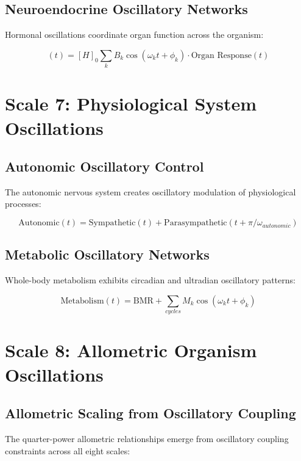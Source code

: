 \documentclass[twocolumn]{article}
\begin{document}
\subsection{Neuroendocrine Oscillatory Networks}

Hormonal oscillations coordinate organ function across the organism:

\begin{equation}
[H](t) = [H]_0 \sum_{k} B_k \cos(\omega_k t + \phi_k) \cdot \text{Organ Response}(t)
\end{equation}

\section{Scale 7: Physiological System Oscillations}

\subsection{Autonomic Oscillatory Control}

The autonomic nervous system creates oscillatory modulation of physiological processes:

\begin{equation}
\text{Autonomic}(t) = \text{Sympathetic}(t) + \text{Parasympathetic}(t + \pi/\omega_{autonomic})
\end{equation}

\subsection{Metabolic Oscillatory Networks}

Whole-body metabolism exhibits circadian and ultradian oscillatory patterns:

\begin{equation}
\text{Metabolism}(t) = \text{BMR} + \sum_{cycles} M_k \cos(\omega_k t + \phi_k)
\end{equation}

\section{Scale 8: Allometric Organism Oscillations}

\subsection{Allometric Scaling from Oscillatory Coupling}

The quarter-power allometric relationships emerge from oscillatory coupling constraints across all eight scales:
\end{document}
